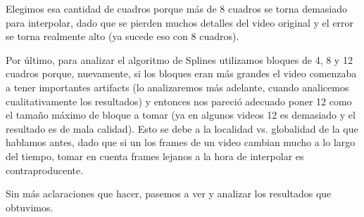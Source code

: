 Elegimos esa cantidad de cuadros porque más de 8 cuadros se torna demasiado para interpolar, dado que se pierden muchos detalles del video original y el error se torna realmente alto (ya sucede eso con 8 cuadros).

Por último, para analizar el algoritmo de Splines utilizamos bloques de 4, 8 y 12 cuadros porque, nuevamente, si los bloques eran más grandes el video comenzaba a tener importantes artifacts (lo analizaremos más adelante, cuando analicemos cualitativamente los resultados) y entonces nos pareció adecuado poner 12 como el tamaño máximo de bloque a tomar (ya en algunos videos 12 es demasiado y el resultado es de mala calidad). Esto se debe a la localidad vs. globalidad de la que hablamos antes, dado que si un los frames de un video cambian mucho a lo largo del tiempo, tomar en cuenta frames lejanos a la hora de interpolar es contraproducente.

Sin más aclaraciones que hacer, pasemos a ver y analizar los resultados que obtuvimos.


